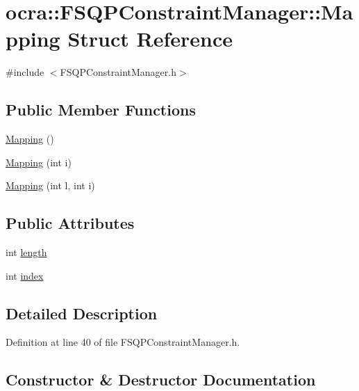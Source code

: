 \hypertarget{structocra_1_1FSQPConstraintManager_1_1Mapping}{}\section{ocra\+:\+:F\+S\+Q\+P\+Constraint\+Manager\+:\+:Mapping Struct Reference}
\label{structocra_1_1FSQPConstraintManager_1_1Mapping}


{\ttfamily \#include $<$F\+S\+Q\+P\+Constraint\+Manager.\+h$>$}

\subsection*{Public Member Functions}
\begin{DoxyCompactItemize}
\item 
\hyperlink{structocra_1_1FSQPConstraintManager_1_1Mapping_a71f614869ea1169fad3e51545a6c2385}{Mapping} ()
\item 
\hyperlink{structocra_1_1FSQPConstraintManager_1_1Mapping_a167e78a7d81b7024c6d63743c7fd4b2a}{Mapping} (int i)
\item 
\hyperlink{structocra_1_1FSQPConstraintManager_1_1Mapping_a82a59fc4b00d863a2527e5265a965441}{Mapping} (int l, int i)
\end{DoxyCompactItemize}
\subsection*{Public Attributes}
\begin{DoxyCompactItemize}
\item 
int \hyperlink{structocra_1_1FSQPConstraintManager_1_1Mapping_a223da0da4c89d6cbc8d025a867943194}{length}
\item 
int \hyperlink{structocra_1_1FSQPConstraintManager_1_1Mapping_a10fd8eae295eb4d5f9dc4258b065275b}{index}
\end{DoxyCompactItemize}


\subsection{Detailed Description}


Definition at line 40 of file F\+S\+Q\+P\+Constraint\+Manager.\+h.



\subsection{Constructor \& Destructor Documentation}
